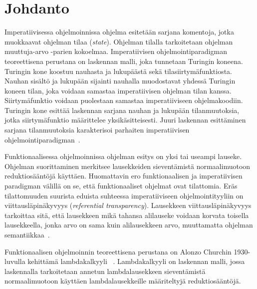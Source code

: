 \section{Johdanto}

Imperatiivisessa ohjelmoinnissa ohjelma esitetään sarjana komentoja, jotka muokkaavat ohjelman tilaa (\textit{state}). Ohjelman tilalla tarkoitetaan ohjelman muuttuja-arvo -parien kokoelmaa. Imperatiivisen ohjelmointiparadigman teoreettisena perustana on laskennan malli, joka tunnetaan Turingin koneena. Turingin kone koostuu nauhasta ja lukupäästä sekä tilasiirtymäfunktiosta. Nauhan sisältö ja lukupään sijainti nauhalla muodostavat yhdessä Turingin koneen tilan, joka voidaan samastaa imperatiivisen ohjelman tilan kanssa. Siirtymäfunktio voidaan puolestaan samastaa imperatiiviseen ohjelmakoodiin. Turingin kone esittää laskennan sarjana nauhan ja lukupään tilanmuutoksia, jotka siirtymäfunktio määrittelee yksikäsitteisesti. Juuri laskennan esittäminen sarjana tilanmuutoksia karakterisoi parhaiten imperatiivisen ohjelmointiparadigman~\cite[s.~3]{Hudak89}.
\par
Funktionaalisessa ohjelmoinnissa ohjelman esitys on yksi tai useampi lauseke. Ohjelman suorittaminen merkitsee lausekkeiden sieventämistä normaalimuotoon reduktiosääntöjä käyttäen. Huomattavin ero funktionaalisen ja imperatiivisen paradigman välillä on se, että funktionaaliset ohjelmat ovat tilattomia. Eräs tilattomuuden suurista eduista suhteessa imperatiiviseen ohjelmointityyliin on viittausläpinäkyvyys (\textit{referential transparency}). Lausekkeen viittausläpinäkyvyys tarkoittaa sitä, että lausekkeen mikä tahansa alilauseke voidaan korvata toisella lausekkeella, jonka arvo on sama kuin alilausekkeen arvo, muuttamatta ohjelman semantiikkaa~\cite[s.~5]{Hudak89}.  
\par
Funktionaalisen ohjelmoinnin teoreettisena perustana on Alonzo Churchin 1930-luvulla kehittämä lambdakalkyyli ~\cite[s.~37--50]{PJ1987}. Lambdakalkyyli on laskennan malli, jossa laskennalla tarkoitetaan annetun lambdalausekkeen sieventämistä normaalimuotoon käyttäen lambdalausekkeille määriteltyjä reduktiosääntöjä.